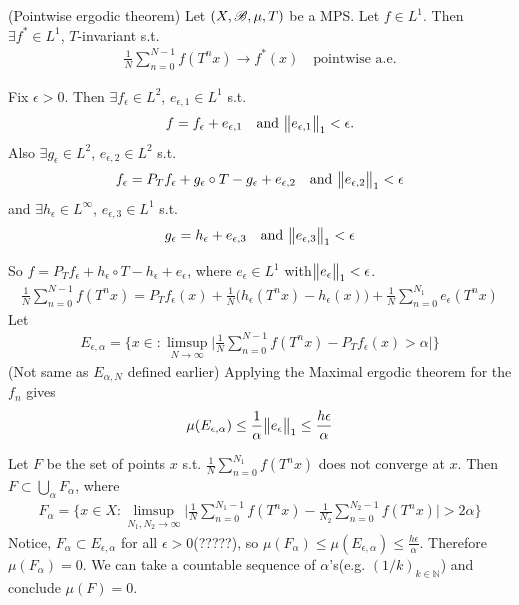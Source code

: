 \documentclass[12pt,a4paper]{report}
\newenvironment{proof}
{\begin{changemargin}{1cm}{0.5cm} 
	}%
	{\end{changemargin}
}
\begin{document}
\thm (Pointwise ergodic theorem) Let $(X,\mathscr{B}, \mu, T)$ be a MPS. Let $f\in L^1$. Then $\exists f^* \in L^1$, $T$-invariant s.t.
\begin{align*}
\frac{1}{N} \sum_{n=0}^{N-1} f(T^n x) \rightarrow f^* (x) \quad \text{pointwise a.e.}
\end{align*}
\begin{proof}
\pf Fix $\epsilon >0$. Then $\exists f_{\epsilon} \in L^2$, $e_{\epsilon, 1} \in L^1$ s.t.
\begin{align*}
f = f_{\epsilon} + e_{\epsilon,1}\quad \text{and } \bigl\lVert e_{\epsilon,1}\bigr\rVert_{1} <\epsilon.
\end{align*}
Also $\exists g_{\epsilon} \in L^2$, $e_{\epsilon,2} \in L^2$ s.t.
\begin{align*}
f_{\epsilon} = P_T f_{\epsilon} + g_{\epsilon} \circ T - g_{\epsilon} + e_{\epsilon,2} \quad \text{and } \bigl\lVert e_{\epsilon,2}\bigr\rVert_{1} <\epsilon
\end{align*}
and $\exists h_{\epsilon} \in L^{\infty}$, $e_{\epsilon,3} \in L^1$ s.t.
\begin{align*}
g_{\epsilon} = h_{\epsilon} + e_{\epsilon,3}\quad \text{and } \bigl\lVert e_{\epsilon,3}\bigr\rVert_{1}<\epsilon
\end{align*}

\quad So $f = P_T f_{\epsilon} + h_{\epsilon}\circ T - h_{\epsilon} + e_{\epsilon}$, where $e_{\epsilon} \in L^1$ with$ \bigl\lVert e_{\epsilon}\bigr\rVert_{1} <\epsilon$.
\begin{align*}
\frac{1}{N} \sum_{n=0}^{N-1} f(T^n x) = P_T f_{\epsilon}(x) + \frac{1}{N} \big( h_{\epsilon}(T^n x) - h_{\epsilon}(x) \big) + \frac{1}{N}\sum_{n=0}^{N_1} e_{\epsilon}(T^n x)
\end{align*}
Let
\begin{align*}
E_{\epsilon,\alpha} = \{ x\in : \limsup_{N\rightarrow \infty} \Big| \frac{1}{N} \sum_{n=0}^{N-1} f(T^n x) - P_T f_{\epsilon}(x) > \alpha  \Big| \}
\end{align*} 
(Not same as $E_{\alpha, N}$ defined earlier)
Applying the Maximal ergodic theorem for the $f_n$ gives
\begin{align*}
\mu(E_{\epsilon,\alpha} ) \leq \frac{1}{\alpha} \bigl\lVert e_{\epsilon}\bigr\rVert_{1} \leq \frac{h\epsilon}{\alpha}
\end{align*}

\quad Let $F$ be the set of points $x$ s.t. $\frac{1}{N} \sum_{n=0}^{N_1} f(T^n x)$ does not converge at $x$. Then $F\subset \bigcup_{\alpha}F_{\alpha}$, where
\begin{align*}
F_{\alpha} = \{x\in X : \limsup_{N_1,N_2 \rightarrow \infty} \Big| \frac{1}{N} \sum_{n=0}^{N_1 -1} f(T^n x) - \frac{1}{N_2} \sum_{n=0}^{N_2 -1} f(T^n x) \Big| >2\alpha  \}
\end{align*}
Notice, $F_{\alpha} \subset E_{\epsilon, \alpha}$ for all $\epsilon>0$(?????), so $\mu(F_{\alpha}) \leq \mu(E_{\epsilon,\alpha}) \leq \frac{h \epsilon}{\alpha}$. Therefore $\mu(F_{\alpha}) =0$. We can take a countable sequence of $\alpha$'s(e.g. $(1/k)_{k\in \mathbb{N}}$) and conclude $\mu(F) = 0$.


\end{proof}
\end{document}
